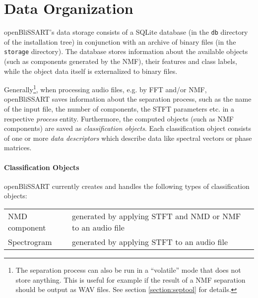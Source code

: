%
%


\section{Data Organization}

openBliSSART's data storage consists of a SQLite database \cite{SQLite} (in the
{\tt db} directory of the installation tree) in conjunction with an archive of
binary files (in the {\tt storage} directory). The database stores information
about the available objects (such as components generated by the NMF), their
features and class labels, while the object data itself is externalized to
binary files.

Generally\footnote{The separation process can also be run in a ``volatile'' mode
  that does not store anything. This is useful for example if the result of a
  NMF separation should be output as WAV files. See section
  \ref{section:septool} for details.}, when processing audio files, e.g. by FFT
and/or NMF, openBliSSART saves information about the separation process, such as
the name of the input file, the number of components, the STFT parameters
etc. in a respective \emph{process} entity. Furthermore, the computed objects
(such as NMF components) are saved as \emph{classification objects}. Each
classification object consists of one or more \emph{data descriptors} which
describe data like spectral vectors or phase matrices.

\paragraph{Classification Objects} openBliSSART currently creates and handles
the following types of classification objects:
\begin{center}
  \begin{tabular}{|p{}|p{}|}
    \hline
    NMD component & generated by applying STFT and NMD or NMF
    to an audio file \\
    Spectrogram & generated by applying STFT to an audio file \\
    \hline
  \end{tabular}
\end{center}

